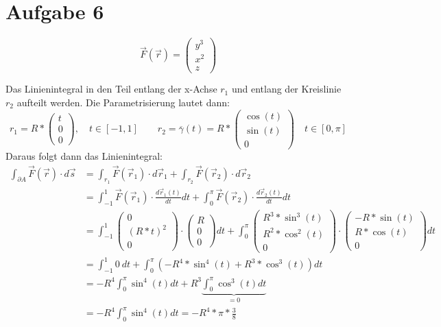 \documentclass[a4paper]{article}
\begin{document}
\newpage
\section*{Aufgabe 6}
\[
	\vec F (\vec r) = 
	\begin{pmatrix}
		y^3 \\ x^2 \\ z
	\end{pmatrix}
\]

Das Linienintegral in den Teil entlang der x-Achse $r_1$ und entlang der Kreislinie $r_2$ aufteilt werden. Die Parametrisierung lautet dann:
\[
	r_1 = R * \begin{pmatrix} t \\ 0 \\ 0 \end{pmatrix}, \quad 
	t \in [-1, 1] \qquad 
	r_2 = \overline \gamma (t) = R *
		\begin{pmatrix}
			\cos(t) \\ \sin(t) \\ 0
		\end{pmatrix}
		\quad
	t \in [0, \pi ]
\]
Daraus folgt dann das Linienintegral:
\begin{align*}
	\int_{\partial A} \vec F (\vec r ) \cdot d\vec s
	&= \int_{r_1} \vec F (\vec r_1 ) \cdot d\vec r_1 +
	\int_{r_2} \vec F (\vec r_2 ) \cdot d\vec r_2 \\
	&= \int_{-1}^1 \vec F (\vec r_1 ) \cdot \frac{d\vec r_1(t)}{dt} dt +
	\int_0^\pi \vec F (\vec r_2 ) \cdot \frac{d\vec r_2(t)}{dt} dt \\
	&= \int_{-1}^1
	\begin{pmatrix} 0 \\ (R*t)^2 \\ 0 \end{pmatrix}
	\cdot
	\begin{pmatrix} R \\ 0 \\ 0 \end{pmatrix}
	dt + 
	\int_0^\pi
	\begin{pmatrix} R^3 * \sin^3(t) \\ R^2 * \cos^2(t) \\ 0 \end{pmatrix}
	\cdot
	\begin{pmatrix} -R*\sin(t) \\ R*\cos(t) \\ 0 \end{pmatrix}
	dt \\
	&= \int_{-1}^1 0 \ dt + 
	\int_0^\pi
	\left(
	-R^4 * \sin^4(t) + R^3 * \cos^3(t)
	\right)
	dt \\
	&= -R^4 \int_0^\pi \sin^4(t) dt + 
	R^3 \underbrace{\int_0^\pi \cos^3(t) dt }_{= 0} \\
	&= -R^4 \int_0^\pi \sin^4(t) dt = -R^4 * \pi * \frac 3 8
\end{align*}
\end{document}

